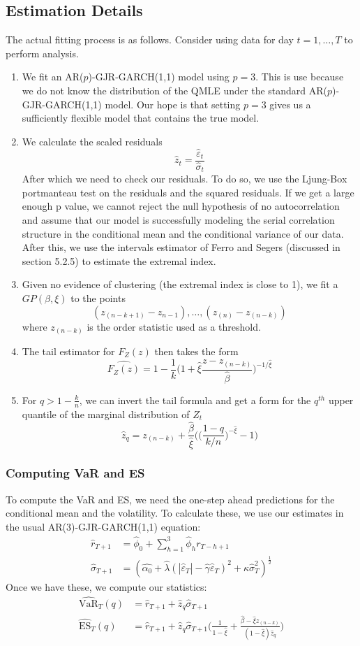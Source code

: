 \documentclass{article}
\theoremstyle{definition}
\theoremstyle{definition}
\begin{document}
\subsection{Estimation Details}
The actual fitting process is as follows. Consider using data for day $t=1,\hdots, T$ to perform analysis.
\begin{enumerate}
    \item We fit an AR($p$)-GJR-GARCH(1,1) model using $p=3$. This is use because we do not know the distribution of the QMLE under the standard AR($p$)-GJR-GARCH(1,1) model. Our hope is that setting $p=3$ gives us a sufficiently flexible model that contains the true model.
    \item We calculate the scaled residuals
    \[\hat{z}_t= \frac{\hat\varepsilon_t}{\hat\sigma_t}\]
    After which we need to check our residuals. To do so, we use the Ljung-Box portmanteau test on the residuals and the squared residuals. If we get a large enough p value, we cannot reject the null hypothesis of no autocorrelation and assume that our model is successfully modeling the serial correlation structure in the conditional mean and the conditional variance of our data. After this, we use the intervals estimator of Ferro and Segers (discussed in section 5.2.5) to estimate the extremal index.
    \item Given no evidence of clustering (the extremal index is close to 1), we fit a $GP(\beta,\xi)$ to the points
    \[(z_{(n-k+1)}- z_{n-1}), \hdots, (z_{(n)}- z_{(n-k)}) \]
    where $z_{(n-k)}$ is the order statistic used as a threshold.
    \item The tail estimator for $F_Z(z)$ then takes the form
    \[\widehat{F_Z(z)}= 1- \frac{1}{k} \bigg( 1 +\hat\xi \frac{z-z_{(n-k)}}{\hat\beta} \bigg)^{-1/\hat\xi}\]
    \item For $q>1-\frac{k}{n}$, we can invert the tail formula and get a form for the $q^{th}$ upper quantile of the marginal distribution of $Z_t$
    \[\hat{z}_q= z_{(n-k)}+\frac{\hat\beta}{\hat\xi} \bigg( \big(\frac{1-q}{k/n}  \big)^{-\hat\xi}-1 \bigg)\]
\end{enumerate}
\subsubsection{Computing VaR and ES}
To compute the VaR and ES, we need the one-step ahead predictions for the conditional mean and the volatility. To calculate these, we use our estimates in the usual AR(3)-GJR-GARCH(1,1) equation:
\begin{align*}
    \hat{r}_{T+1}&= \hat{\phi}_0+\sum_{h=1}^3\hat{\phi}_hr_{T-h+1}\\
    \hat\sigma_{T+1}&= (\hat{\alpha_0}+\hat\lambda (|\hat\varepsilon_T|-\hat\gamma\hat\varepsilon_T)^2 +\hat\kappa\hat\sigma_T^2)^{\frac{1}{2}}
\end{align*}
Once we have these, we compute our statistics:
\begin{align*}
    \widehat{\text{VaR}}_T(q)&= \hat{r}_{T+1}+ \hat{z}_q\hat\sigma_{T+1}\\
    \widehat{\text{ES}}_T(q)&= \hat{r}_{T+1}+ \hat{z}_q\hat\sigma_{T+1} \bigg( \frac{1}{1-\hat\xi} +\frac{\hat\beta - \hat\xi z_{(n-k)}}{(1-\hat\xi)\hat{z}_q} \bigg)
\end{align*}
\end{document}
